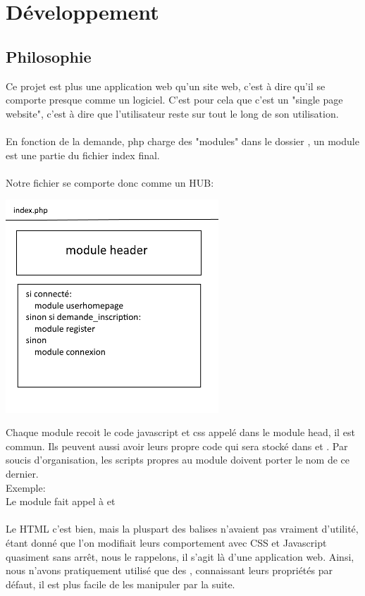 \documentclass[a4paper, 11pt]{article}
\begin{document}
\section{Développement}

\subsection{Philosophie}

Ce projet est plus une application web qu'un site web, c'est à dire qu'il se comporte presque comme un logiciel.
C'est pour cela que c'est un "single page website", c'est à dire que l'utilisateur reste sur  tout le long
de son utilisation.
\\ \\
En fonction de la demande, php charge des "modules" dans le dossier ,
un module est une partie du fichier index final.
\\ \\
Notre fichier  se comporte donc comme un HUB:

\begin{center}
	\includegraphics[width=8cm]{index_struct.png}
\end{center}

Chaque module recoit le code javascript et css appelé dans le module head, il est commun. Ils peuvent
aussi avoir leurs propre code qui sera stocké dans  et .
Par soucis d'organisation, les scripts propres au module doivent porter le nom de ce dernier. \\
Exemple: \\
Le module  fait appel à  et 
\\ \\
Le HTML c'est bien, mais la pluspart des balises n'avaient pas vraiment d'utilité, étant donné que l'on
modifiait leurs comportement avec CSS et Javascript quasiment sans arrêt, nous le rappelons, il s'agit là d'une application web. Ainsi, nous n'avons pratiquement utilisé que des ,
connaissant leurs propriétés par défaut, il est plus facile de les manipuler par la suite. \\
\\
\end{document}
